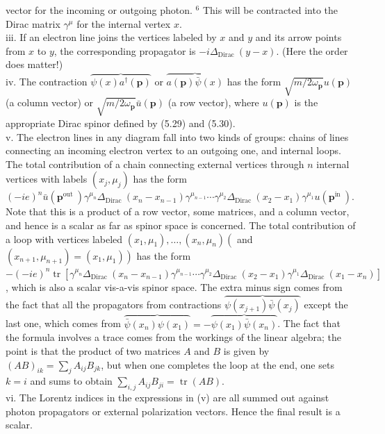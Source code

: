 \documentclass[10pt, letterpaper]{article}
\begin{document}
vector for the incoming or outgoing photon. ${ }^{6}$ This will be contracted into the Dirac matrix $\gamma^{\mu}$ for the internal vertex $x$.\\
iii. If an electron line joins the vertices labeled by $x$ and $y$ and its arrow points from $x$ to $y$, the corresponding propagator is $-i \Delta_{\text {Dirac }}(y-x)$. (Here the order does matter!)\\
iv. The contraction $\overbrace{\psi(x) a^{\dagger}(\mathbf{p})}$ or $\overbrace{a(\mathbf{p}) \bar{\psi}(x)}$ has the form $\sqrt{m / 2 \omega_{\mathbf{p}}} u(\mathbf{p})$ (a column vector) or $\sqrt{m / 2 \omega_{\mathbf{p}}} \bar{u}(\mathbf{p})$ (a row vector), where $u(\mathbf{p})$ is the appropriate Dirac spinor defined by (5.29) and (5.30).\\
v. The electron lines in any diagram fall into two kinds of groups: chains of lines connecting an incoming electron vertex to an outgoing one, and internal loops. The total contribution of a chain connecting external vertices through $n$ internal vertices with labels $\left(x_{j}, \mu_{j}\right)$ has the form\\
$(-i e)^{n} \bar{u}\left(\mathbf{p}^{\text {out }}\right) \gamma^{\mu_{n}} \Delta_{\text {Dirac }}\left(x_{n}-x_{n-1}\right) \gamma^{\mu_{n-1}} \cdots \gamma^{\mu_{2}} \Delta_{\text {Dirac }}\left(x_{2}-x_{1}\right) \gamma^{\mu_{1}} u\left(\mathbf{p}^{\text {in }}\right)$.\\
Note that this is a product of a row vector, some matrices, and a column vector, and hence is a scalar as far as spinor space is concerned. The total contribution of a loop with vertices labeled $\left(x_{1}, \mu_{1}\right), \ldots,\left(x_{n}, \mu_{n}\right)\left(\right.$ and $\left(x_{n+1}, \mu_{n+1}\right)= \left.\left(x_{1}, \mu_{1}\right)\right)$ has the form\\
$-(-i e)^{n} \operatorname{tr}\left[\gamma^{\mu_{n}} \Delta_{\text {Dirac }}\left(x_{n}-x_{n-1}\right) \gamma^{\mu_{n-1}} \cdots \gamma^{\mu_{2}} \Delta_{\text {Dirac }}\left(x_{2}-x_{1}\right) \gamma^{\mu_{1}} \Delta_{\text {Dirac }}\left(x_{1}-x_{n}\right)\right]$, which is also a scalar vis-a-vis spinor space. The extra minus sign comes from the fact that all the propagators from contractions $\overbrace{\psi\left(x_{j+1}\right) \bar{\psi}\left(x_{j}\right)}$ except the last one, which comes from $\overbrace{\bar{\psi}\left(x_{n}\right) \psi\left(x_{1}\right)}=-\overbrace{\psi\left(x_{1}\right) \bar{\psi}\left(x_{n}\right)}$. The fact that the formula involves a trace comes from the workings of the linear algebra; the point is that the product of two matrices $A$ and $B$ is given by $(A B)_{i k}=\sum_{j} A_{i j} B_{j k}$, but when one completes the loop at the end, one sets $k=i$ and sums to obtain $\sum_{i, j} A_{i j} B_{j i}=\operatorname{tr}(A B)$.\\
vi. The Lorentz indices in the expressions in (v) are all summed out against photon propagators or external polarization vectors. Hence the final result is a scalar.
\end{document}
